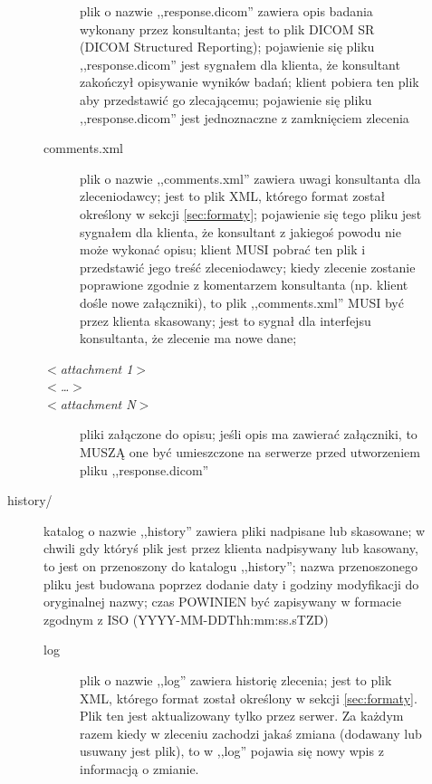 \documentclass[a4paper]{article}
\begin{document}
\begin{description}
\begin{description}
\begin{description}
			plik o nazwie ,,response.dicom'' zawiera opis badania wykonany przez
			konsultanta; jest to plik DICOM SR (DICOM Structured Reporting); pojawienie się pliku
			,,response.dicom'' jest sygnałem dla klienta, że konsultant zakończył opisywanie
			wyników badań; klient pobiera ten plik aby przedstawić go zlecającemu; pojawienie się pliku
			,,response.dicom'' jest jednoznaczne z zamknięciem zlecenia
			\item[comments.xml] plik o nazwie ,,comments.xml'' zawiera uwagi konsultanta dla
			zleceniodawcy; jest to plik XML, którego format został określony w
			sekcji \ref{sec:formaty}; pojawienie się tego pliku jest sygnałem dla klienta, że
			konsultant z jakiegoś powodu nie może wykonać opisu; klient MUSI pobrać ten plik i przedstawić jego
			treść zleceniodawcy; kiedy zlecenie zostanie poprawione zgodnie z komentarzem
			konsultanta (np. klient dośle nowe załączniki), to plik ,,comments.xml'' MUSI być przez
			klienta skasowany; jest to sygnał dla interfejsu konsultanta, że zlecenie ma nowe
			dane;
			\item[$<$\textit{attachment 1}$>$]   
			\item[$<$\textit{\ldots}$>$]   
			\item[$<$\textit{attachment N}$>$] pliki załączone do opisu; jeśli opis ma zawierać
			załączniki, to MUSZĄ one być umieszczone na serwerze przed utworzeniem pliku
			,,response.dicom''
			\end{description}
		\item[history/] katalog o nazwie ,,history'' zawiera pliki nadpisane lub
		skasowane; w chwili gdy któryś plik jest przez klienta nadpisywany lub kasowany, to
		jest on przenoszony do katalogu ,,history''; nazwa przenoszonego  pliku jest budowana
		poprzez dodanie daty i godziny modyfikacji do oryginalnej nazwy; czas POWINIEN
	    być zapisywany w formacie zgodnym z ISO (YYYY-MM-DDThh:mm:ss.sTZD)
			\begin{description}
  			\item[log] plik o nazwie ,,log'' zawiera historię zlecenia; jest to plik XML,
  			którego format został określony w sekcji \ref{sec:formaty}. Plik ten jest
  			aktualizowany tylko przez serwer. Za każdym razem kiedy w zleceniu zachodzi jakaś
  			zmiana (dodawany lub usuwany jest plik), to w ,,log'' pojawia się nowy wpis z
  			informacją o zmianie.
			\end{description}
		\end{description}
\end{description}
\end{document}
